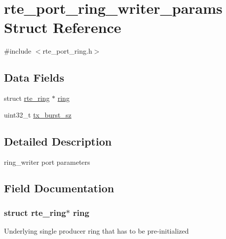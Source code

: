 \hypertarget{structrte__port__ring__writer__params}{}\section{rte\+\_\+port\+\_\+ring\+\_\+writer\+\_\+params Struct Reference}
\label{structrte__port__ring__writer__params}


{\ttfamily \#include $<$rte\+\_\+port\+\_\+ring.\+h$>$}

\subsection*{Data Fields}
\begin{DoxyCompactItemize}
\item 
struct \hyperlink{structrte__ring}{rte\+\_\+ring} $\ast$ \hyperlink{structrte__port__ring__writer__params_a1dfc25cca5a340eff30700b60fd41339}{ring}
\item 
uint32\+\_\+t \hyperlink{structrte__port__ring__writer__params_a9ed7dbe6241b97c9b68a9491e77c84d0}{tx\+\_\+burst\+\_\+sz}
\end{DoxyCompactItemize}


\subsection{Detailed Description}
ring\+\_\+writer port parameters 

\subsection{Field Documentation}
\hypertarget{structrte__port__ring__writer__params_a1dfc25cca5a340eff30700b60fd41339}{}
\subsubsection[{ring}]{\setlength{\rightskip}{0pt plus 5cm}struct {\bf rte\+\_\+ring}$\ast$ ring}\label{structrte__port__ring__writer__params_a1dfc25cca5a340eff30700b60fd41339}
Underlying single producer ring that has to be pre-\/initialized \hypertarget{structrte__port__ring__writer__params_a9ed7dbe6241b97c9b68a9491e77c84d0}{}

